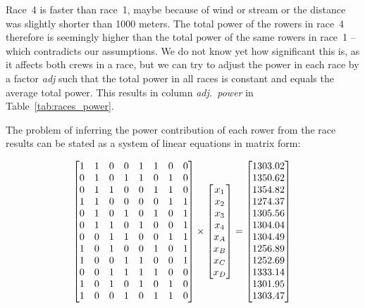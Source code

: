 \documentclass[a4paper,11pt]{article}
\begin{document}
Race~4 is faster than race~1, maybe because of wind or stream
or the distance was slightly shorter than 1000 meters.  The total power
of the rowers in race~4 therefore is seemingly higher than the total
power of the same rowers in race~1 -- which contradicts our assumptions.
We do not know yet how significant this is, as it affects both crews in a
race, but we can try to adjust the power in each race by a factor
\emph{adj} such that the total power in all races is constant and equals
the average total power.  This results in column \emph{adj.~power} in
Table~\ref{tab:races_power}.

The problem of inferring the power contribution of each rower from the
race results can be stated as a system of linear equations in matrix
form:

$$
  \begin{bmatrix}
   1 & 1 & 0 & 0 & 1 & 1 & 0 & 0 \\ 
   0 & 1 & 0 & 1 & 1 & 0 & 1 & 0 \\ 
   0 & 1 & 1 & 0 & 0 & 1 & 1 & 0 \\ 
   1 & 1 & 0 & 0 & 0 & 0 & 1 & 1 \\ 
   0 & 1 & 0 & 1 & 0 & 1 & 0 & 1 \\ 
   0 & 1 & 1 & 0 & 1 & 0 & 0 & 1 \\ 
   0 & 0 & 1 & 1 & 0 & 0 & 1 & 1 \\ 
   1 & 0 & 1 & 0 & 0 & 1 & 0 & 1 \\ 
   1 & 0 & 0 & 1 & 1 & 0 & 0 & 1 \\ 
   0 & 0 & 1 & 1 & 1 & 1 & 0 & 0 \\ 
   1 & 0 & 1 & 0 & 1 & 0 & 1 & 0 \\ 
   1 & 0 & 0 & 1 & 0 & 1 & 1 & 0 \\ 
  \end{bmatrix} 
  \times
  \begin{bmatrix}
  x_1\\
  x_2\\
  x_3\\
  x_4\\
  x_A\\
  x_B\\
  x_C\\
  x_D\\
  \end{bmatrix}
  =
  \begin{bmatrix}
   1303.02 \\ 
   1350.62 \\ 
   1354.82 \\ 
   1274.37 \\ 
   1305.56 \\ 
   1304.04 \\ 
   1304.49 \\ 
   1256.89 \\ 
   1252.69 \\ 
   1333.14 \\ 
   1301.95 \\ 
   1303.47 \\  
  \end{bmatrix}\\
$$
\end{document}
